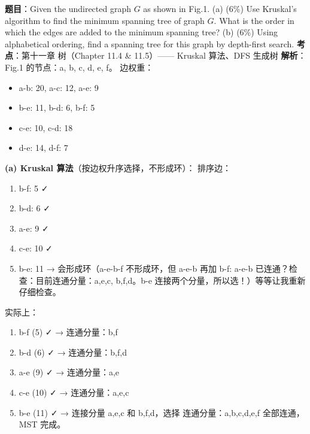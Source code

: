 \documentclass[10pt,a4paper,openany]{ctexbook}
\theoremstyle{definition}
\theoremstyle{remark}
\begin{document}
\textbf{题目}：Given the undirected graph $G$ as shown in Fig.1.
(a) (6\%) Use Kruskal's algorithm to find the minimum spanning tree of graph $G$. What is the order in which the edges are added to the minimum spanning tree?
(b) (6\%) Using alphabetical ordering, find a spanning tree for this graph by depth-first search.
\textbf{考点}：第十一章 树（Chapter 11.4 \& 11.5）—— Kruskal 算法、DFS 生成树
\textbf{解析}：
Fig.1 的节点：a, b, c, d, e, f。
边权重：
\begin{itemize}
\item a-b: 20, a-c: 12, a-e: 9
\item b-e: 11, b-d: 6, b-f: 5
\item c-e: 10, c-d: 18
\item d-e: 14, d-f: 7

\end{itemize}

\textbf{(a) Kruskal 算法}（按边权升序选择，不形成环）：
排序边：
\begin{enumerate}
\item b-f: 5 ✓
\item b-d: 6 ✓
\item a-e: 9 ✓
\item c-e: 10 ✓
\item b-e: 11 → 会形成环（a-e-b-f 不形成环，但 a-e-b 再加 b-f: a-e-b 已连通？检查：目前连通分量：{a,e,c}, {b,f,d}。b-e 连接两个分量，所以选！）等等让我重新仔细检查。

\end{enumerate}

实际上：
\begin{enumerate}
\item b-f (5) ✓ → 连通分量：{b,f}
\item b-d (6) ✓ → 连通分量：{b,f,d}
\item a-e (9) ✓ → 连通分量：{a,e}
\item c-e (10) ✓ → 连通分量：{a,e,c}
\item b-e (11) ✓ → 连接分量 {a,e,c} 和 {b,f,d}，选择
连通分量：{a,b,c,d,e,f} 全部连通，MST 完成。


\end{enumerate}
\end{document}
